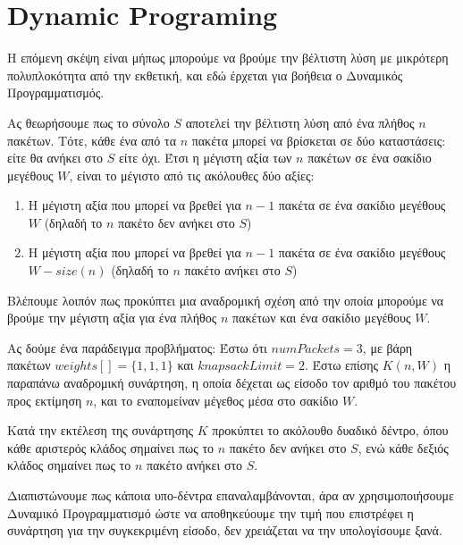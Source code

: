 \documentclass{article}
\begin{document}
\section{Dynamic Programing}

Η επόμενη σκέψη είναι μήπως μπορούμε να βρούμε την βέλτιστη λύση με μικρότερη
πολυπλοκότητα από την εκθετική, και εδώ έρχεται για βοήθεια ο Δυναμικός
Προγραμματισμός.

Ας θεωρήσουμε πως το σύνολο $S$ αποτελεί την βέλτιστη λύση από ένα πλήθος $n$
πακέτων. Τότε, κάθε ένα από τα $n$ πακέτα μπορεί να βρίσκεται σε δύο
καταστάσεις: είτε θα ανήκει στο $S$ είτε όχι. Έτσι η μέγιστη αξία των $n$
πακέτων σε ένα σακίδιο μεγέθους $W$, είναι το μέγιστο από τις ακόλουθες δύο
αξίες:

\begin{enumerate}
    \item Η μέγιστη αξία που μπορεί να βρεθεί για $n-1$ πακέτα σε ένα σακίδιο
            μεγέθους $W$ (δηλαδή το $n$ πακέτο δεν ανήκει στο $S$)
    \item Η μέγιστη αξία που μπορεί να βρεθεί για $n-1$ πακέτα σε ένα σακίδιο
            μεγέθους $W-size(n)$ (δηλαδή το $n$ πακέτο ανήκει στο $S$)
\end{enumerate}

Βλέπουμε λοιπόν πως προκύπτει μια αναδρομική σχέση από την οποία μπορούμε να
βρούμε την μέγιστη αξία για ένα πλήθος $n$ πακέτων και ένα σακίδιο μεγέθους $W$.

Ας δούμε ένα παράδειγμα προβλήματος: Έστω ότι $numPackets=3$, με βάρη πακέτων
$weights[]=\{1, 1, 1\}$ και $knapsackLimit=2$. Έστω επίσης $K(n, W)$ η παραπάνω
αναδρομική συνάρτηση, η οποία δέχεται ως είσοδο τον αριθμό του πακέτου προς
εκτίμηση $n$, και το εναπομείναν μέγεθος μέσα στο σακίδιο $W$.

Κατά την εκτέλεση της συνάρτησης $K$ προκύπτει το ακόλουθο δυαδικό δέντρο, όπου
κάθε αριστερός κλάδος σημαίνει πως το $n$ πακέτο δεν ανήκει στο $S$, ενώ
κάθε δεξιός κλάδος σημαίνει πως το $n$ πακέτο ανήκει στο $S$.

\begin{center}
\end{center}

Διαπιστώνουμε πως κάποια υπο-δέντρα επαναλαμβάνονται, άρα αν χρησιμοποιήσουμε
Δυναμικό Προγραμματισμό ώστε να αποθηκεύουμε την τιμή που επιστρέφει η συνάρτηση
για την συγκεκριμένη είσοδο, δεν χρειάζεται να την υπολογίσουμε ξανά.
\end{document}
